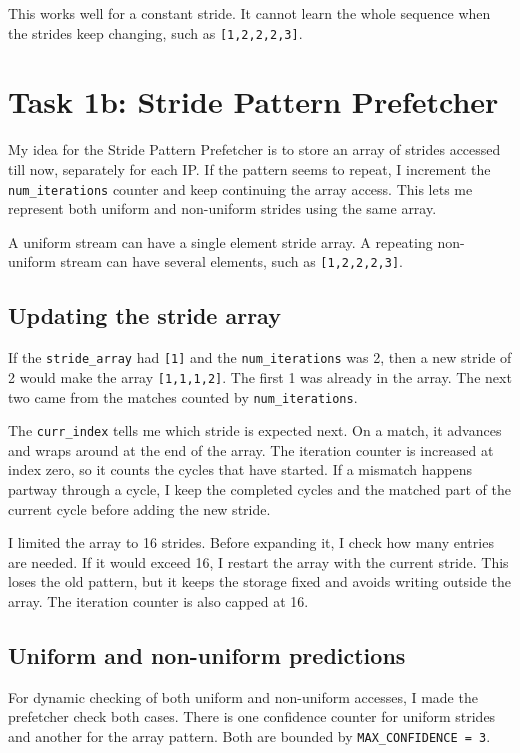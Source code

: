 \documentclass[11pt,a4paper]{article}
\begin{document}
This works well for a constant stride. It cannot learn the whole
sequence when the strides keep changing, such as \texttt{[1,2,2,2,3]}.

\section{Task 1b: Stride Pattern Prefetcher}

My idea for the Stride Pattern Prefetcher is to store an array of
strides accessed till now, separately for each IP. If the pattern seems
to repeat, I increment the \texttt{num\_iterations} counter and keep
continuing the array access. This lets me represent both uniform and
non-uniform strides using the same array.

A uniform stream can have a single element stride array. A repeating
non-uniform stream can have several elements, such as
\texttt{[1,2,2,2,3]}.

\subsection{Updating the stride array}

If the \texttt{stride\_array} had \texttt{[1]} and the
\texttt{num\_iterations} was 2, then a new stride of 2 would make the
array \texttt{[1,1,1,2]}. The first 1 was already in the array. The next
two came from the matches counted by \texttt{num\_iterations}.

The \texttt{curr\_index} tells me which stride is expected next.
On a match, it advances and wraps around at the end of the array.
The iteration counter is increased at index zero, so it counts the
cycles that have started. If a mismatch happens partway through a
cycle, I keep the completed cycles and the matched part of the current
cycle before adding the new stride.

I limited the array to 16 strides. Before expanding it, I check how
many entries are needed. If it would exceed 16, I restart the array
with the current stride. This loses the old pattern, but it keeps the
storage fixed and avoids writing outside the array. The iteration
counter is also capped at 16.

\subsection{Uniform and non-uniform predictions}

For dynamic checking of both uniform and non-uniform accesses, I made
the prefetcher check both cases. There is one confidence counter for
uniform strides and another for the array pattern. Both are bounded
by \texttt{MAX\_CONFIDENCE = 3}.
\end{document}
